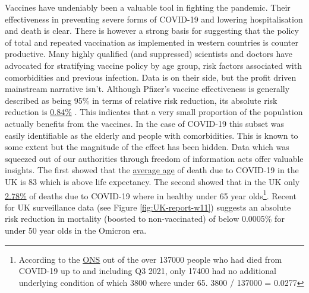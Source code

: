 \documentclass[11pt,a4paper,notitlepage]{report}
\begin{document}
Vaccines have undeniably been a valuable tool in fighting the pandemic. Their effectiveness in preventing severe forms of COVID-19 and lowering hospitalisation and death is clear. There is however a strong basis for suggesting that the policy of total and repeated vaccination as implemented in western countries is counter productive. Many highly qualified (and suppressed) scientists and doctors have advocated for stratifying vaccine policy by age group, risk factors associated with comorbidities and previous infection. Data is on their side, but the profit driven mainstream narrative isn't. Although Pfizer's vaccine effectiveness is generally described as being 95\% in terms of relative risk reduction, its absolute risk reduction is \href{https://www.thelancet.com/journals/lanmic/article/PIIS2666-5247(21)00069-0/fulltext}{0.84\%} \cite{lancet20042021}. This indicates that a very small proportion of the population actually benefits from the vaccines. In the case of COVID-19 this subset was easily identifiable as the elderly and people with comorbidities. This is known to some extent but the magnitude of the effect has been hidden. Data which was squeezed out of our authorities through freedom of information acts offer valuable insights. The first showed that the \href{https://www.ons.gov.uk/aboutus/transparencyandgovernance/freedomofinformationfoi/averageageofthosewhohaddiedwithcovid19}{average age} of death due to COVID-19 in the UK is 83 \cite{freedomofinformationfoi11012021} which is above life expectancy. The second showed that in the UK only \href{https://www.ons.gov.uk/aboutus/transparencyandgovernance/freedomofinformationfoi/deathsfromcovid19withnootherunderlyingcauses}{2.78\%} \cite{freedomofinformationfoi16122021} of deaths due to COVID-19 where in healthy under 65 year olds\footnote{According to the \href{https://www.ons.gov.uk/aboutus/transparencyandgovernance/freedomofinformationfoi/deathsfromcovid19withnootherunderlyingcauses}{ONS} \cite{freedomofinformationfoi16122021} out of the over 137000 people who had died from COVID-19 up to and including Q3 2021, only 17400 had no additional underlying condition of which 3800 where under 65. 3800 / 137000 = 0.0277}. Recent  for UK surveillance data (see Figure \ref{fig:UK-report-w11}) suggests an absolute risk reduction in mortality (boosted to non-vaccinated) of below 0.0005\% for under 50 year olds in the Omicron era.

\end{document}
